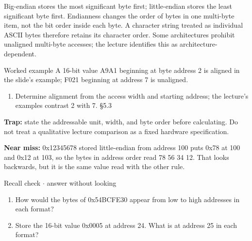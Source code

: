 \documentclass[11pt]{article}
\begin{document}
\begin{keepsection}
Big-endian stores the most significant byte first; little-endian stores the least significant byte first. Endianness changes the order of bytes in one multi-byte item, not the bit order inside each byte. A character string treated as individual ASCII bytes therefore retains its character order. Some architectures prohibit unaligned multi-byte accesses; the lecture identifies this as architecture-dependent.

\begin{workedbox}{Worked example}
A 16-bit value A9A1 beginning at byte address 2 is aligned in the slide’s example; F021 beginning at address 7 is unaligned.

\begin{enumerate}
\item Determine alignment from the access width and starting address; the lecture’s examples contrast 2 with 7. \hfill{\small\color{FAUblue}§5.3}
\end{enumerate}
\end{workedbox}

\begin{notebox}\textbf{Trap:} state the addressable unit, width, and byte order before calculating. Do not treat a qualitative lecture comparison as a fixed hardware specification.\end{notebox}

\begin{notebox}\textbf{Near miss:} 0x12345678 stored little-endian from address 100 puts 0x78 at 100 and 0x12 at 103, so the bytes in address order read 78 56 34 12. That looks backwards, but it is the same value read with the other rule.\end{notebox}

\begin{recallbox}{Recall check \ensuremath{\cdot} answer without looking}
\begin{enumerate}
\item How would the bytes of 0x54BCFE30 appear from low to high addresses in each format?
\item Store the 16-bit value 0x0005 at address 24. What is at address 25 in each format?
\end{enumerate}

\end{recallbox}
\end{keepsection}
\end{document}
